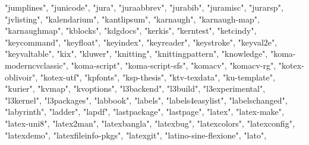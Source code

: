 \documentclass[
]{article}
\newenvironment{Shaded}{\begin{snugshade}}{\end{snugshade}}
\newcommand{\NormalTok}[1]{#1}
\newcommand{\StringTok}[1]{\textcolor[rgb]{0.31,0.60,0.02}{#1}}
\begin{document}
\begin{Shaded}
\begin{Highlighting}[]
\StringTok{"jumplines"}\NormalTok{, }\StringTok{"junicode"}\NormalTok{, }\StringTok{"jura"}\NormalTok{, }\StringTok{"juraabbrev"}\NormalTok{, }\StringTok{"jurabib"}\NormalTok{, }\StringTok{"juramisc"}\NormalTok{, }
\StringTok{"jurarsp"}\NormalTok{, }\StringTok{"jvlisting"}\NormalTok{, }\StringTok{"kalendarium"}\NormalTok{, }\StringTok{"kantlipsum"}\NormalTok{, }\StringTok{"karnaugh"}\NormalTok{, }
\StringTok{"karnaugh{-}map"}\NormalTok{, }\StringTok{"karnaughmap"}\NormalTok{, }\StringTok{"kblocks"}\NormalTok{, }\StringTok{"kdgdocs"}\NormalTok{, }\StringTok{"kerkis"}\NormalTok{, }
\StringTok{"kerntest"}\NormalTok{, }\StringTok{"ketcindy"}\NormalTok{, }\StringTok{"keycommand"}\NormalTok{, }\StringTok{"keyfloat"}\NormalTok{, }\StringTok{"keyindex"}\NormalTok{, }
\StringTok{"keyreader"}\NormalTok{, }\StringTok{"keystroke"}\NormalTok{, }\StringTok{"keyval2e"}\NormalTok{, }\StringTok{"keyvaltable"}\NormalTok{, }\StringTok{"kix"}\NormalTok{, }\StringTok{"kluwer"}\NormalTok{, }
\StringTok{"knitting"}\NormalTok{, }\StringTok{"knittingpattern"}\NormalTok{, }\StringTok{"knowledge"}\NormalTok{, }\StringTok{"koma{-}moderncvclassic"}\NormalTok{, }
\StringTok{"koma{-}script"}\NormalTok{, }\StringTok{"koma{-}script{-}sfs"}\NormalTok{, }\StringTok{"komacv"}\NormalTok{, }\StringTok{"komacv{-}rg"}\NormalTok{, }\StringTok{"kotex{-}oblivoir"}\NormalTok{, }
\StringTok{"kotex{-}utf"}\NormalTok{, }\StringTok{"kpfonts"}\NormalTok{, }\StringTok{"ksp{-}thesis"}\NormalTok{, }\StringTok{"ktv{-}texdata"}\NormalTok{, }\StringTok{"ku{-}template"}\NormalTok{, }
\StringTok{"kurier"}\NormalTok{, }\StringTok{"kvmap"}\NormalTok{, }\StringTok{"kvoptions"}\NormalTok{, }\StringTok{"l3backend"}\NormalTok{, }\StringTok{"l3build"}\NormalTok{, }\StringTok{"l3experimental"}\NormalTok{, }
\StringTok{"l3kernel"}\NormalTok{, }\StringTok{"l3packages"}\NormalTok{, }\StringTok{"labbook"}\NormalTok{, }\StringTok{"labels"}\NormalTok{, }\StringTok{"labels4easylist"}\NormalTok{, }
\StringTok{"labelschanged"}\NormalTok{, }\StringTok{"labyrinth"}\NormalTok{, }\StringTok{"ladder"}\NormalTok{, }\StringTok{"lapdf"}\NormalTok{, }\StringTok{"lastpackage"}\NormalTok{, }
\StringTok{"lastpage"}\NormalTok{, }\StringTok{"latex"}\NormalTok{, }\StringTok{"latex{-}make"}\NormalTok{, }\StringTok{"latex{-}uni8"}\NormalTok{, }\StringTok{"latex2man"}\NormalTok{, }
\StringTok{"latexbangla"}\NormalTok{, }\StringTok{"latexbug"}\NormalTok{, }\StringTok{"latexcolors"}\NormalTok{, }\StringTok{"latexconfig"}\NormalTok{, }\StringTok{"latexdemo"}\NormalTok{, }
\StringTok{"latexfileinfo{-}pkgs"}\NormalTok{, }\StringTok{"latexgit"}\NormalTok{, }\StringTok{"latino{-}sine{-}flexione"}\NormalTok{, }\StringTok{"lato"}\NormalTok{, }

\end{Highlighting}
\end{Shaded}
\end{document}
